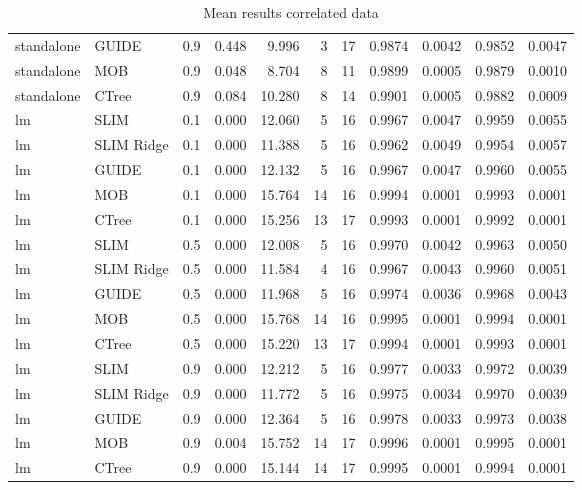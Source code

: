 \begin{table}[!htb]
\begin{tabular}[t]{l|l|r|r|r|r|r|r|r|r|r}
standalone & GUIDE & 0.9 & 0.448 & 9.996 & 3 & 17 & 0.9874 & 0.0042 & 0.9852 & 0.0047\\
standalone & MOB & 0.9 & 0.048 & 8.704 & 8 & 11 & 0.9899 & 0.0005 & 0.9879 & 0.0010\\
standalone & CTree & 0.9 & 0.084 & 10.280 & 8 & 14 & 0.9901 & 0.0005 & 0.9882 & 0.0009\\
\hline
lm & SLIM & 0.1 & 0.000 & 12.060 & 5 & 16 & 0.9967 & 0.0047 & 0.9959 & 0.0055\\
lm & SLIM Ridge & 0.1 & 0.000 & 11.388 & 5 & 16 & 0.9962 & 0.0049 & 0.9954 & 0.0057\\
lm & GUIDE & 0.1 & 0.000 & 12.132 & 5 & 16 & 0.9967 & 0.0047 & 0.9960 & 0.0055\\
lm & MOB & 0.1 & 0.000 & 15.764 & 14 & 16 & 0.9994 & 0.0001 & 0.9993 & 0.0001\\
lm & CTree & 0.1 & 0.000 & 15.256 & 13 & 17 & 0.9993 & 0.0001 & 0.9992 & 0.0001\\
\hline
lm & SLIM & 0.5 & 0.000 & 12.008 & 5 & 16 & 0.9970 & 0.0042 & 0.9963 & 0.0050\\
lm & SLIM Ridge & 0.5 & 0.000 & 11.584 & 4 & 16 & 0.9967 & 0.0043 & 0.9960 & 0.0051\\
lm & GUIDE & 0.5 & 0.000 & 11.968 & 5 & 16 & 0.9974 & 0.0036 & 0.9968 & 0.0043\\
lm & MOB & 0.5 & 0.000 & 15.768 & 14 & 16 & 0.9995 & 0.0001 & 0.9994 & 0.0001\\
lm & CTree & 0.5 & 0.000 & 15.220 & 13 & 17 & 0.9994 & 0.0001 & 0.9993 & 0.0001\\
\hline
lm & SLIM & 0.9 & 0.000 & 12.212 & 5 & 16 & 0.9977 & 0.0033 & 0.9972 & 0.0039\\
lm & SLIM Ridge & 0.9 & 0.000 & 11.772 & 5 & 16 & 0.9975 & 0.0034 & 0.9970 & 0.0039\\
lm & GUIDE & 0.9 & 0.000 & 12.364 & 5 & 16 & 0.9978 & 0.0033 & 0.9973 & 0.0038\\
lm & MOB & 0.9 & 0.004 & 15.752 & 14 & 17 & 0.9996 & 0.0001 & 0.9995 & 0.0001\\
lm & CTree & 0.9 & 0.000 & 15.144 & 14 & 17 & 0.9995 & 0.0001 & 0.9994 & 0.0001\\
\hline
\end{tabular}
\caption{Mean results correlated data}
\label{tab:linear_smooth_correlated_summary}
\end{table} 


